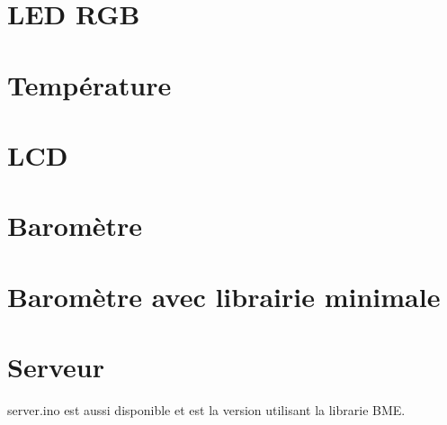 \documentclass{report}
\begin{document}
	\chapter{LED RGB\label{code:rgb}}
		
			
	\chapter{Température\label{code:temp}}
		
			
	\chapter{LCD\label{code:lcd}}
		
	\chapter{Baromètre\label{code:bme}}
		
			
	\chapter{Baromètre avec librairie minimale\label{code:bme2}}
		
		
	\chapter{Serveur}
		
		
		server.ino est aussi disponible et est la version utilisant la librarie BME.
\end{document}
